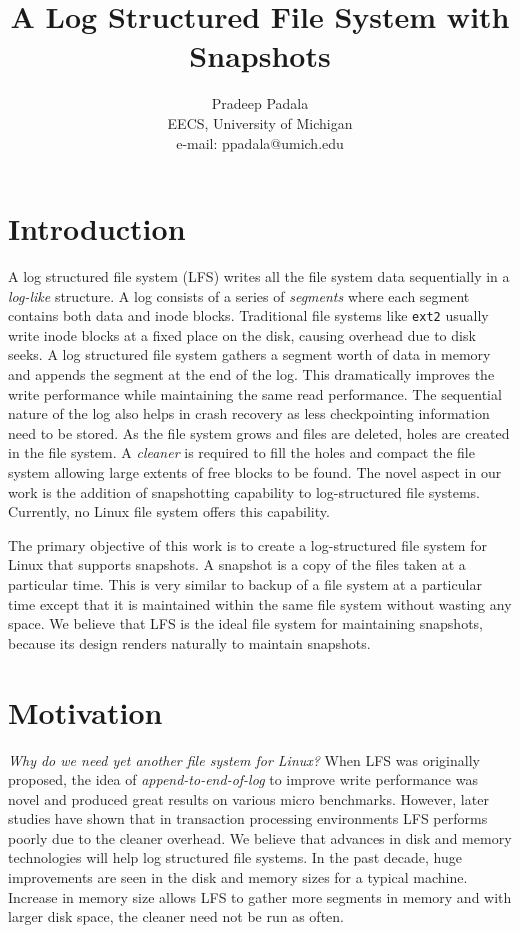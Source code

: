 \documentclass{article}
\begin{document}
\graphicspath{{images/}}
\title{A Log Structured File System with Snapshots}
\author{Pradeep Padala \\
EECS, University of Michigan\\
e-mail: ppadala@umich.edu}%

\maketitle

\section{Introduction}

A log structured file system (LFS) \cite{Rosenblum91} writes all the file
system data sequentially in a \textit{log-like} structure. A log consists of a
series of \textit{segments} where each segment contains both data and inode
blocks.  Traditional file systems like \texttt{ext2} usually write inode
blocks at a fixed place on the disk, causing overhead due to disk seeks. A log
structured file system gathers a segment worth of data in memory and appends
the segment at the end of the log.  This dramatically improves the write
performance while maintaining the same read performance. The sequential
nature of the log also helps in crash recovery as less checkpointing
information need to be stored.  As the file system grows and files are
deleted, holes are created in the file system. A \textit{cleaner} is required
to fill the holes and compact the file system allowing large extents of free
blocks to be found. The novel aspect in our work is the addition of
snapshotting capability to log-structured file systems. Currently, no Linux
file system offers this capability.

The primary objective of this work is to create a log-structured file system
for Linux that supports snapshots. A snapshot is a copy of the files taken at
a particular time. This is very similar to backup of a file system at a
particular time except that it is maintained within the same file system
without wasting any space. We
believe that LFS is the ideal file system for maintaining snapshots, because
its design renders naturally to maintain snapshots.

\section{Motivation}
\textit{Why do we need yet another file system for Linux?} When LFS was
originally proposed, the idea of \textit{append-to-end-of-log} to improve
write performance was novel and produced great results on various micro
benchmarks. However, later studies \cite{log_vs_cluster} have shown that in
transaction processing environments LFS performs poorly due to the cleaner
overhead.  We believe that advances in disk and memory technologies will help
log structured file systems. In the past decade, huge improvements are seen in
the disk and memory sizes for a typical machine. Increase in memory size
allows LFS to gather more segments in memory and with larger disk space, the
cleaner need not be run as often.
\end{document}
